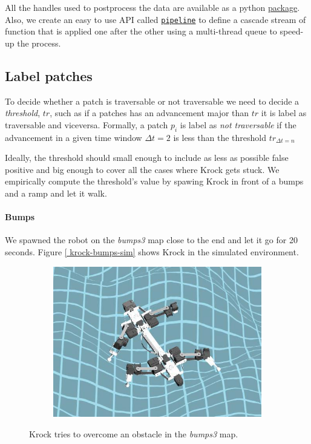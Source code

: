 \documentclass[../document.tex]{subfiles}
\begin{document}
All the handles used to postprocess the data are available as a python \href{https://github.com/FrancescoSaverioZuppichini/Master-Thesis/tree/master/core/utilities/postprocessing/handlers}{package}. Also, we create an easy to use API called \href{https://github.com/FrancescoSaverioZuppichini/Master-Thesis/tree/master/core/utilities/pipeline}{\texttt{pipeline}} to define a cascade stream of function that is applied one after the other using a multi-thread queue to speed-up the process.

\subsection{Label patches}
\label{seseec: label-patches}
To decide whether a patch is traversable or not traversable we need to decide a \emph{threshold}, $tr$, such as if a patches has an advancement major than $tr$ it is label as traversable and viceversa. Formally, a patch $p_i$ is label as \emph{not traversable} if the advancement in a given time window $\Delta t = 2$ is less than the threshold $tr_{\Delta t = n}$

Ideally, the threshold should small enough to include as less as possible false positive and big enough to cover all the cases where Krock gets stuck. We empirically compute the threshold's value by spawing Krock in front of a bumps and a ramp and let it walk.
\paragraph{Bumps} We spawned the robot on the \emph{bumps3} map close to the end and let it go for 20 seconds. Figure \ref{ krock-bumps-sim} shows Krock in the simulated environment.

\begin{figure}[htbp]
\centering
    \begin{subfigure}[b]{0.45\textwidth}
    \includegraphics[width=\linewidth]{../img/3/find_tr/krock-bumps.jpg}
    \end{subfigure}
\caption{Krock tries to overcome an obstacle in the \emph{bumps3} map.}
\label{fig : krock-bumps-sim}
\end{figure}
\end{document}

